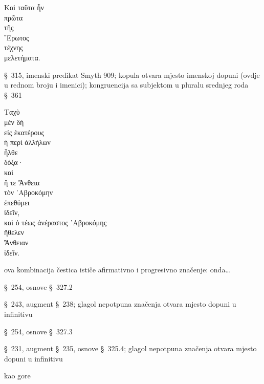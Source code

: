 {\large
\begin{greek}
\noindent Καὶ ταῦτα ἦν \\
πρῶτα \\
\tabto{2em} τῆς \\
\tabto{4em} ῎Ερωτος \\
\tabto{2em} τέχνης \\
μελετήματα. \\

\end{greek}
}

\begin{description}[noitemsep]
\item[ἦν] §~315, imenski predikat Smyth 909; kopula otvara mjesto imenskoj dopuni (ovdje u rednom broju i imenici); kongruencija sa subjektom u pluralu srednjeg roda §~361

\end{description}

{\large
\begin{greek}
\noindent Ταχὺ \\
μὲν δὴ \\
\tabto{2em} εἰς ἑκατέρους \\
ἡ περὶ ἀλλήλων \\
\tabto{2em} ἦλθε \\
δόξα· \\
καὶ \\
ἥ τε Ἄνθεια \\
\tabto{2em} τὸν ῾Αβροκόμην \\
\tabto{2em} ἐπεθύμει \\
\tabto{4em} ἰδεῖν, \\
καὶ ὁ τέως ἀνέραστος ῾Αβροκόμης \\
\tabto{2em} ἤθελεν \\
\tabto{2em} Ἄνθειαν \\
\tabto{4em} ἰδεῖν. \\

\end{greek}
}

\begin{description}[noitemsep]
\item[μὲν δὴ] ova kombinacija čestica ističe afirmativno i progresivno značenje: onda\dots 
\item[ἦλθε] §~254, osnove §~327.2
\item[ἐπεθύμει] §~243, augment §~238; glagol nepotpuna značenja otvara mjesto dopuni u infinitivu
\item[ἰδεῖν] §~254, osnove §~327.3
\item[ἤθελεν] §~231, augment §~235, osnove §~325.4; glagol nepotpuna značenja otvara mjesto dopuni u infinitivu
\item[ἰδεῖν] kao gore
\end{description}




